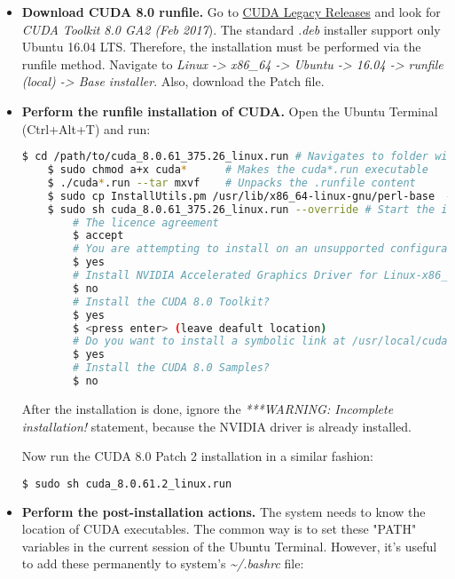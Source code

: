 \begin{itemize}
	\item \textbf{Download CUDA 8.0 runfile.} Go to \href{https://developer.nvidia.com/cuda-80-ga2-download-archive}{CUDA Legacy Releases} and look for \textit{CUDA Toolkit 8.0 GA2 (Feb 2017}). The standard \textit{.deb} installer support only Ubuntu 16.04 LTS. Therefore, the installation must be performed via the runfile method. Navigate to \textit{Linux -> x86\_64 -> Ubuntu -> 16.04 -> runfile (local) -> Base installer}. Also, download the Patch file. 
	
	\item \textbf{Perform the runfile installation of CUDA.} Open the Ubuntu Terminal (Ctrl+Alt+T) and run:
	
	\begin{lstlisting}[language=bash]
	$ cd /path/to/cuda_8.0.61_375.26_linux.run # Navigates to folder with CUDA
	$ sudo chmod a+x cuda*		# Makes the cuda*.run executable
	$ ./cuda*.run --tar mxvf 	# Unpacks the .runfile content
	$ sudo cp InstallUtils.pm /usr/lib/x86_64-linux-gnu/perl-base  # Copy one of the extracted files to perl-base
	$ sudo sh cuda_8.0.61_375.26_linux.run --override # Start the installation 
		# The licence agreement
		$ accept 
		# You are attempting to install on an unsupported configuration. Do you wish to continue?
		$ yes 
		# Install NVIDIA Accelerated Graphics Driver for Linux-x86_64 375.26?
		$ no
		# Install the CUDA 8.0 Toolkit?
		$ yes 
		$ <press enter> (leave deafult location)
		# Do you want to install a symbolic link at /usr/local/cuda?
		$ yes
		# Install the CUDA 8.0 Samples?
		$ no
	\end{lstlisting}
	
	After the installation is done, ignore the \textit{***WARNING: Incomplete installation!} statement, because the NVIDIA driver is already installed. 
	
	Now run the CUDA 8.0 Patch 2 installation in a similar fashion:
	
	\begin{lstlisting}[language=bash]
	$ sudo sh cuda_8.0.61.2_linux.run
	\end{lstlisting}
	
	\item \textbf{Perform the post-installation actions.} The system needs to know the location of CUDA executables. The common way is to set these "PATH" variables in the current session of the Ubuntu Terminal. However, it's useful to add these permanently to system's \textit{\textasciitilde{}/.bashrc} file:
		

\end{itemize}
